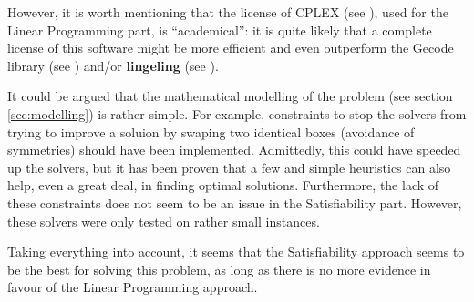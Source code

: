 \hfill

However, it is worth mentioning that the license of CPLEX (see \cite{CplexWEB}), used for the
Linear Programming part, is ``academical'': it is quite likely that a complete license
of this software might be more efficient and even outperform the Gecode library (see
\cite{GecodeWEB}) and/or \textbf{lingeling} (see \cite{lingeling}).

\hfill

It could be argued that the mathematical modelling of the problem (see section
\ref{sec:modelling}) is rather simple. For example, constraints to stop the solvers from
trying to improve a soluion by swaping two identical boxes (avoidance of symmetries) should
have been implemented. Admittedly, this could have speeded up the solvers, but it has been
proven that a few and simple heuristics can also help, even a great deal, in finding optimal
solutions. Furthermore, the lack of these constraints does not seem to be an issue in the
Satisfiability part. However, these solvers were only tested on rather small instances.

\hfill

Taking everything into account, it seems that the Satisfiability approach seems to be the
best for solving this problem, as long as there is no more evidence in favour of the
Linear Programming approach.











